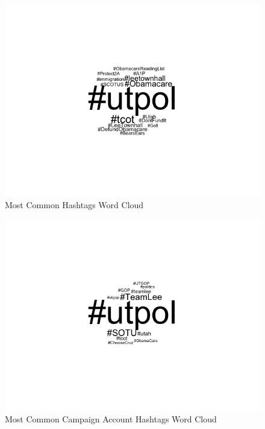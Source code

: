 \documentclass{article}
\begin{document}
\begin{figure}[h!]
\includegraphics[width =\textwidth]{image/wordpoolht.png}
\caption{Most Common Hashtags Word Cloud}
\end{figure}
\begin{figure}[h!]
\includegraphics[width =\textwidth]{image/wordcloudht_campaign.png}
\caption{Most Common Campaign Account Hashtags Word Cloud}
\end{figure}
\end{document}
